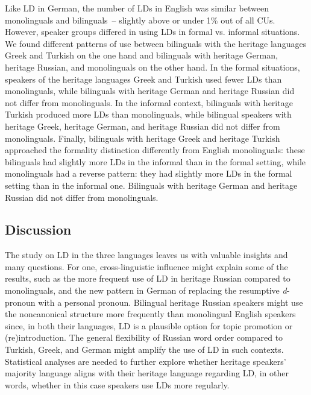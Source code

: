 \documentclass[output=paper,colorlinks,citecolor=brown]{langscibook}
\begin{document}
Like LD in German, the number of LDs in English was similar between monolinguals and bilinguals~-- slightly above or under 1\% out of all CUs. However, speaker groups differed in using LDs in formal vs. informal situations. We found different patterns of use between bilinguals with the heritage languages Greek and Turkish on the one hand and bilinguals with heritage German, heritage Russian, and monolinguals on the other hand. In the formal situations, speakers of the heritage languages Greek and Turkish used fewer LDs than monolinguals, while bilinguals with heritage German and heritage Russian did not differ from monolinguals. In the informal context, bilinguals with heritage Turkish produced more LDs than monolinguals, while bilingual speakers with heritage Greek, heritage German, and heritage Russian did not differ from monolinguals. Finally, bilinguals with heritage Greek and heritage Turkish approached the formality distinction differently from English monolinguals: these bilinguals had slightly more LDs in the informal than in the formal setting, while monolinguals had a reverse pattern: they had slightly more LDs in the formal setting than in the informal one. Bilinguals with heritage German and heritage Russian did not differ from monolinguals.


\subsection{Discussion}

The study on LD in the three languages leaves us with valuable insights and many questions. For one, cross-linguistic influence might explain some of the results, such as the more frequent use of LD in heritage Russian compared to monolinguals, and the new pattern in German of replacing the resumptive \textit{d}-pronoun with a personal pronoun. Bilingual heritage Russian speakers might use the noncanonical structure more frequently than monolingual English speakers since, in both their languages, LD is a plausible option for topic promotion or (re)introduction. The general flexibility of Russian word order compared to Turkish, Greek, and German might amplify the use of LD in such contexts. Statistical analyses are needed to further explore whether heritage speakers’ majority language aligns with their heritage language regarding LD, in other words, whether in this case speakers use LDs more regularly.
\end{document}
